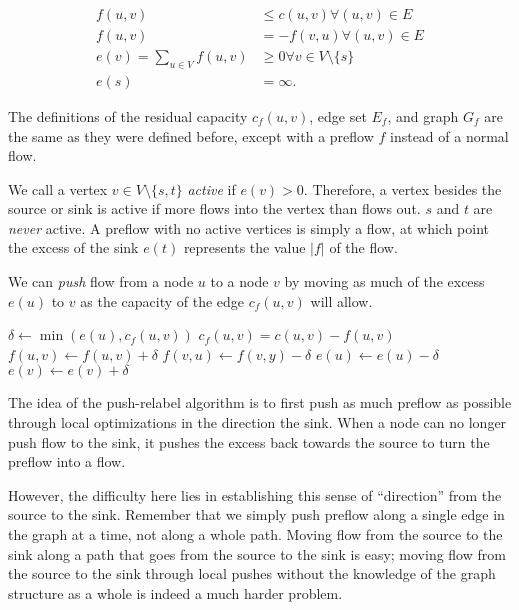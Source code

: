 \begin{align*}
f(u,v) &\le c(u,v) \forall (u,v) \in E \\
f(u,v) &= -f(v,u) \forall (u,v) \in E \\
e(v) = \sum_{u \in V} f(u,v) &\ge 0 \forall v \in V \setminus \{s\} \\
e(s) &= \infty.
\end{align*}

The definitions of the residual capacity $c_f(u,v)$, edge set $E_f$, and graph $G_f$ are the same as they were defined before, except with a preflow $f$ instead of a normal flow.

We call a vertex $v \in V \setminus \{s, t\}$ \textit{active} if $e(v) > 0$. Therefore, a vertex besides the source or sink is active if more flows into the vertex than flows out. $s$ and $t$ are \textit{never} active. A preflow with no active vertices is simply a flow, at which point the excess of the sink $e(t)$ represents the value $|f|$ of the flow.

We can \textit{push} flow from a node $u$ to a node $v$ by moving as much of the excess $e(u)$ to $v$ as the capacity of the edge $c_f(u,v)$ will allow.

\noindent \begin{minipage}{\textwidth}
\begin{algorithmic}
	\State $\delta \gets \min(e(u), c_f(u,v))$
	\Comment $c_f(u,v) = c(u,v) - f(u,v)$
	\State $f(u,v) \gets f(u,v) + \delta$
	\State $f(v,u) \gets f(v,y) - \delta$
	\State $e(u) \gets e(u) - \delta$
	\State $e(v) \gets e(v) + \delta$
\EndFunction
\end{algorithmic}
\end{minipage}

The idea of the push-relabel algorithm is to first push as much preflow as possible through local optimizations in the direction the sink. When a node can no longer push flow to the sink, it pushes the excess back towards the source to turn the preflow into a flow.

However, the difficulty here lies in establishing this sense of ``direction'' from the source to the sink. Remember that we simply push preflow along a single edge in the graph at a time, not along a whole path. Moving flow from the source to the sink along a path that goes from the source to the sink is easy; moving flow from the source to the sink through local pushes without the knowledge of the graph structure as a whole is indeed a much harder problem.

